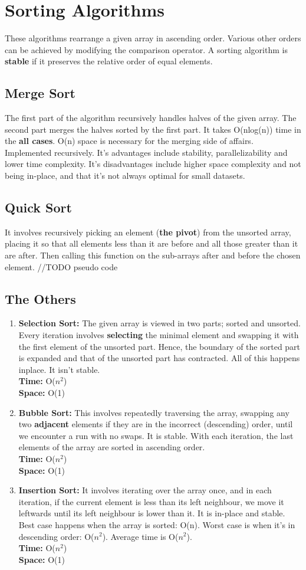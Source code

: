 \documentclass{report}
\newcommand*{\algodis}[4]{
    \textbf{#1:} #2\\%
    \textbf{Time:} #3 \\%
    \textbf{Space:} #4
}
\begin{document}
\section{Sorting Algorithms}
These algorithms rearrange a given array in ascending order.
Various other orders can be achieved by modifying the comparison operator.
A sorting algorithm is \textbf{stable} if it preserves the relative
order of equal elements.
\subsection*{Merge Sort}
The first part of the algorithm recursively handles halves of the given array.
The second part merges the halves sorted by the first part.
It takes O(nlog(n)) time in the \textbf{all cases}. O(n) space is necessary
for the merging side of affairs. Implemented recursively. It's advantages
include stability, parallelizability and lower time complexity. It's disadvantages
include higher space complexity and not being in-place, and that it's not
always optimal for small datasets. 
\subsection*{Quick Sort}
It involves recursively picking an element (\textbf{the pivot})
from the unsorted array, 
placing it so that all elements less than it are before and all
those greater than it are after. Then calling this function on the sub-arrays
after and before the chosen element.
//TODO pseudo code
\subsection*{The Others}
\begin{enumerate}
    \item \algodis{Selection Sort}
    {The given array is viewed in two parts; sorted and unsorted.
    Every iteration involves \textbf{selecting} the minimal element
    and swapping it with the first element of the unsorted part. Hence,
    the boundary of the sorted part is expanded and that of the unsorted
    part has contracted. All of this happens inplace. It isn't stable.}
    {O($n^2$)}{O(1)}
    \item \algodis{Bubble Sort}
    {This involves repeatedly traversing the array,
    swapping any two \textbf{adjacent} elements if they are
    in the incorrect (descending) order, until we encounter
    a run with no swaps. It is stable. With each iteration,
    the last elements of the array are sorted in ascending order.}
    {O($n^2$)}
    {O(1)}
    \item \algodis{Insertion Sort}
    {It involves iterating over the array once, and in each iteration,
    if the current element is less than its left neighbour, we move it
    leftwards until its left neighbour is lower than it. It is in-place
    and stable. Best case happens when the array is sorted: O(n). Worst case
    is when it's in descending order: O($n^2$). Average time is O($n^2$).}
    {O($n^2$)}{O(1)}
\end{enumerate}
\end{document}
